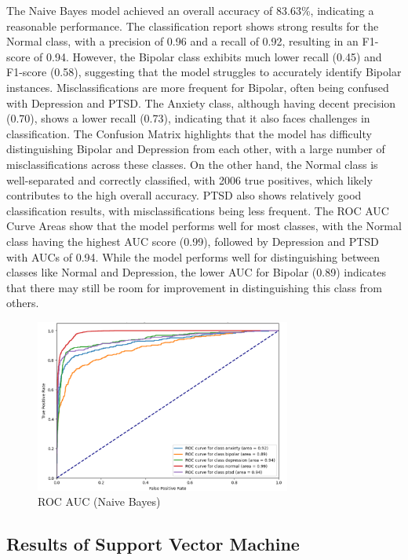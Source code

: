 \noindent
The Naive Bayes model achieved an overall accuracy of 83.63\%, indicating a reasonable performance. The classification report shows strong results for the Normal class, with a precision of 0.96 and a recall of 0.92, resulting in an F1-score of 0.94. However, the Bipolar class exhibits much lower recall (0.45) and F1-score (0.58), suggesting that the model struggles to accurately identify Bipolar instances. Misclassifications are more frequent for Bipolar, often being confused with Depression and PTSD. The Anxiety class, although having decent precision (0.70), shows a lower recall (0.73), indicating that it also faces challenges in classification. The Confusion Matrix highlights that the model has difficulty distinguishing Bipolar and Depression from each other, with a large number of misclassifications across these classes. On the other hand, the Normal class is well-separated and correctly classified, with 2006 true positives, which likely contributes to the high overall accuracy. PTSD also shows relatively good classification results, with misclassifications being less frequent. The ROC AUC Curve Areas show that the model performs well for most classes, with the Normal class having the highest AUC score (0.99), followed by Depression and PTSD with AUCs of 0.94. While the model performs well for distinguishing between classes like Normal and Depression, the lower AUC for Bipolar (0.89) indicates that there may still be room for improvement in distinguishing this class from others.



\begin{figure}[h!]  
    \centering
    \includegraphics[width=0.75\textwidth]{Images/NB ROC.png}  
    \caption{ROC AUC (Naive Bayes)}
    \label{NBROC}  %
\end{figure}


\subsection{Results of Support Vector Machine}

